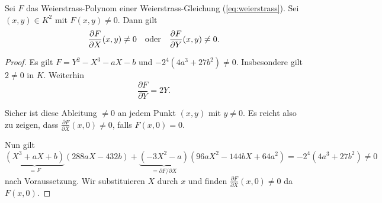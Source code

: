 \begin{lemma}
  \label{lem:smooth}
  Sei $F$ das Weierstrass-Polynom einer Weierstrass-Gleichung
  (\ref{eq:weierstrass}). Sei $(x,y)\in K^2$ mit $F(x,y)\not=0$. Dann
  gilt
  \begin{equation*}
    \frac{\partial F}{\partial X}(x,y)\not=0 \quad\text{oder}\quad
    \frac{\partial F}{\partial Y}(x,y)\not=0.
  \end{equation*}
\end{lemma}
\begin{proof}
  Es gilt $F = Y^2 - X^3-aX-b$ und $-2^4(4a^3+27b^2)\not=0$.
  Insbesondere gilt $2\not=0$ in $K$. Weiterhin
  \begin{equation*}
    \frac{\partial F}{\partial Y} = 2Y. 
  \end{equation*}

  Sicher ist diese Ableitung $\not=0$ an jedem Punkt $(x,y)$ mit
  $y\not=0$.
  Es reicht also zu zeigen, dass $    \frac{\partial F}{\partial
    X}(x,0)\not=0$, falls $F(x,0)=0$.

  Nun gilt
  \begin{equation*}
    \underbrace{(X^3+aX+b)}_{=F}(288aX-432b) +
    \underbrace{(-3X^2-a)}_{= \partial F/\partial X}(96aX^2 - 144bX + 64a^2)
    = -2^4(4a^3+27b^2) \not=0
  \end{equation*}
  nach Voraussetzung.
  Wir substituieren $X$ durch $x$ und finden 
  $\frac{\partial F}{\partial
    X}(x,0)\not=0$ da $F(x,0)$.  
\end{proof}

